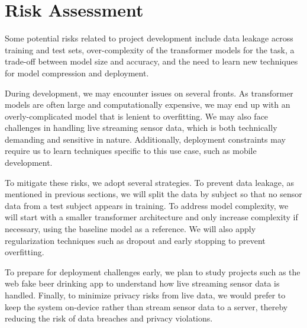 \section{Risk Assessment}

Some potential risks related to project development include data leakage across training and test sets, over-complexity of the transformer models for the task, a trade-off between model size and accuracy, and the need to learn new techniques for model compression and deployment.

During development, we may encounter issues on several fronts. As transformer models are often large and computationally expensive, we may end up with an overly-complicated model that is lenient to overfitting. We may also face challenges in handling live streaming sensor data, which is both technically demanding and sensitive in nature. Additionally, deployment constraints may require us to learn techniques specific to this use case, such as mobile development.

To mitigate these risks, we adopt several strategies. To prevent data leakage, as mentioned in previous sections, we will split the data by subject so that no sensor data from a test subject appears in training. To address model complexity, we will start with a smaller transformer architecture and only increase complexity if necessary, using the baseline model as a reference. We will also apply regularization techniques such as dropout and early stopping to prevent overfitting.

To prepare for deployment challenges early, we plan to study projects such as the web fake beer drinking app to understand how live streaming sensor data is handled. Finally, to minimize privacy risks from live data, we would prefer to keep the system on-device rather than stream sensor data to a server, thereby reducing the risk of data breaches and privacy violations.

